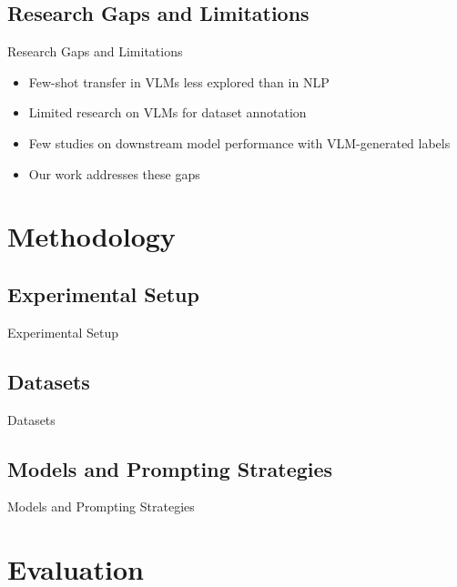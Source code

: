 \documentclass[aspectratio=169]{beamer}
\begin{document}
\subsection{Research Gaps and Limitations}
\begin{frame}{Research Gaps and Limitations}
  \begin{itemize}
    \item Few-shot transfer in VLMs less explored than in NLP
    \item Limited research on VLMs for dataset annotation
    \item Few studies on downstream model performance with VLM-generated labels
    \item Our work addresses these gaps
  \end{itemize}
\end{frame}


\section{Methodology}
\subsection{Experimental Setup}
\begin{frame}{Experimental Setup}
\end{frame}

\subsection{Datasets}
\begin{frame}{Datasets}
\end{frame}

\subsection{Models and Prompting Strategies}
\begin{frame}{Models and Prompting Strategies}
\end{frame}

\section{Evaluation}
\end{document}
